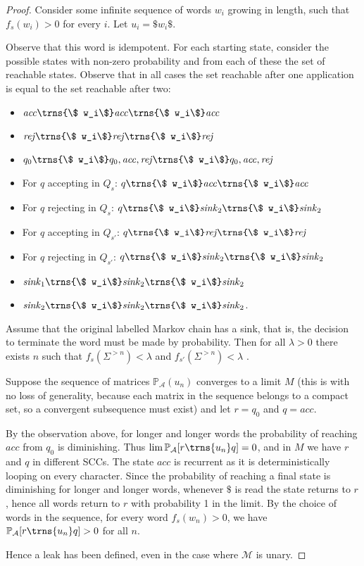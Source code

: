 \documentclass{lmcs}
\theoremstyle{plain}
\theoremstyle{definition}
\theoremstyle{remark}
\newcommand\acc{\mathit{acc}}
\newcommand\rej{\mathit{rej}}
\newcommand\sink{\mathit{sink}}
\newcommand\lmc{\mathcal{M}}
\newcommand\pr{\mathbb{P}}
\newcommand\pa{\mathcal{A}}
\renewcommand\nu{f}
\begin{document}
\begin{proof}

Consider some infinite sequence of words $w_i$ growing in length, such that $\nu_s(w_i) > 0$ for every $i$.
Let $u_i = \$ w_i\$$.

Observe that this word is idempotent. For each starting state, consider the possible states with non-zero probability and from each of these the set of reachable states. Observe that in all cases the set reachable after one application is equal to the set reachable after two:
\begin{itemize}
\item $\acc \trns{\$ w_i\$} \acc \trns{\$ w_i\$} \acc $
\item $\rej \trns{\$ w_i\$} \rej \trns{\$ w_i\$} \rej $
\item $q_0 \trns{\$ w_i\$} q_0, \acc, \rej \trns{\$ w_i\$} q_0,\acc,\rej $

\item For $q$ accepting in $Q_s$:
$q \trns{\$ w_i\$} \acc \trns{\$ w_i\$} \acc $

\item For $q$ rejecting in $Q_s$:
$q \trns{\$ w_i\$}  \sink_2 \trns{\$ w_i\$} \sink_2 $

\item For $q$ accepting in $Q_{s'}$:
$q \trns{\$ w_i\$}  \rej \trns{\$ w_i\$} \rej $

\item For $q$ rejecting in $Q_{s'}$:
$q \trns{\$ w_i\$}  \sink_2 \trns{\$ w_i\$} \sink_2 $

\item
$\sink_1 \trns{\$ w_i\$}  \sink_2 \trns{\$ w_i\$} \sink_2 $
\item
$\sink_2 \trns{\$ w_i\$}  \sink_2 \trns{\$ w_i\$} \sink_2 $.
  \end{itemize}

\noindent Assume that the original labelled Markov chain has a sink, that is, the decision to terminate the word must be made by probability. Then for all $\lambda > 0$ there exists $n$ such that $\nu_s(\Sigma^{>n}) < \lambda$ and $\nu_{s'}(\Sigma^{>n}) < \lambda$ \cite[Lemma 12]{kiefer2018computing}.

Suppose the sequence of matrices $\pr_\pa(u_n)$ converges to a limit $M$ (this is with no loss of generality, because each matrix in the sequence belongs to a compact set, so a convergent subsequence must exist) and let $r = q_0$ and $q = \acc$.

By the observation above, for longer and longer words the probability of reaching $\acc$ from $q_0$ is diminishing. Thus $\lim \pr_\pa[r \trns{u_n} q] = 0$, and in $M$ we have $r$ and $q$ in different SCCs. The state $\acc$ is recurrent as it is deterministically looping on every character. Since the probability of reaching a final state is diminishing for longer and longer words, whenever $\$$ is read the state returns to $r$, hence all words return to $r$ with probability 1 in the limit. By the choice of words in the sequence, for every word $\nu_s(w_n) > 0$, we have $\pr_\pa[r \trns{u_n} q]>0$ for all $n$.

Hence a leak has been defined, even in the case where $\lmc$ is unary.
\end{proof}
\end{document}

